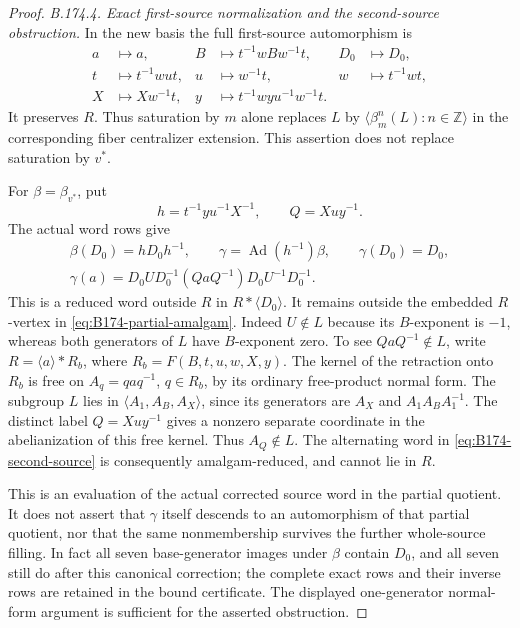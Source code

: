 \begin{proof}
\emph{B.174.4. Exact first-source normalization and the second-source obstruction.}
In the new basis the full first-source automorphism is
\begin{equation}\label{eq:B174-m-action}
 \begin{aligned}
 a&\longmapsto a,& B&\longmapsto t^{-1}wBw^{-1}t,&
 D_0&\longmapsto D_0,\\
 t&\longmapsto t^{-1}wut,& u&\longmapsto w^{-1}t,&
 w&\longmapsto t^{-1}wt,\\
 X&\longmapsto Xw^{-1}t,&
 y&\longmapsto t^{-1}wyu^{-1}w^{-1}t.
 \end{aligned}
\end{equation}
It preserves \(R\). Thus saturation by \(m\) alone replaces
\(L\) by \(\langle\beta_m^n(L):n\in\mathbb Z\rangle\)
in the corresponding fiber centralizer extension. This assertion
does not replace saturation by \(v^*\).

For \(\beta=\beta_{v^*}\), put
\[
 h=t^{-1}yu^{-1}X^{-1},\qquad Q=Xuy^{-1}.
\]
The actual word rows give
\begin{equation}\label{eq:B174-second-source}
 \begin{gathered}
 \beta(D_0)=hD_0h^{-1},\qquad
 \gamma=\operatorname{Ad}(h^{-1})\beta,\qquad\gamma(D_0)=D_0,\\
 \gamma(a)=
 D_0UD_0^{-1}(QaQ^{-1})D_0U^{-1}D_0^{-1}.
 \end{gathered}
\end{equation}
This is a reduced word outside \(R\) in \(R*\langle D_0\rangle\).
It remains outside the embedded \(R\)-vertex in
\eqref{eq:B174-partial-amalgam}. Indeed \(U\notin L\) because
its \(B\)-exponent is \(-1\), whereas both generators of \(L\)
have \(B\)-exponent zero. To see \(QaQ^{-1}\notin L\), write
\(R=\langle a\rangle*R_b\), where
\(R_b=F(B,t,u,w,X,y)\). The kernel of the retraction onto \(R_b\)
is free on \(A_q=qaq^{-1}\), \(q\in R_b\), by its ordinary
free-product normal form. The subgroup \(L\) lies in
\(\langle A_1,A_B,A_X\rangle\), since its generators are
\(A_X\) and \(A_1A_BA_1^{-1}\).
The distinct label \(Q=Xuy^{-1}\) gives a nonzero separate coordinate
in the abelianization of this free kernel. Thus \(A_Q\notin L\).
The alternating word in \eqref{eq:B174-second-source} is consequently
amalgam-reduced, and cannot lie in \(R\).

This is an evaluation of the actual corrected source word in the
partial quotient. It does not assert that \(\gamma\) itself descends
to an automorphism of that partial quotient, nor that the same
nonmembership survives the further whole-source filling.
In fact all seven base-generator images under \(\beta\) contain
\(D_0\), and all seven still do after this canonical correction;
the complete exact rows and their inverse rows are retained in the
bound certificate. The displayed one-generator normal-form argument
is sufficient for the asserted obstruction.


\end{proof}
